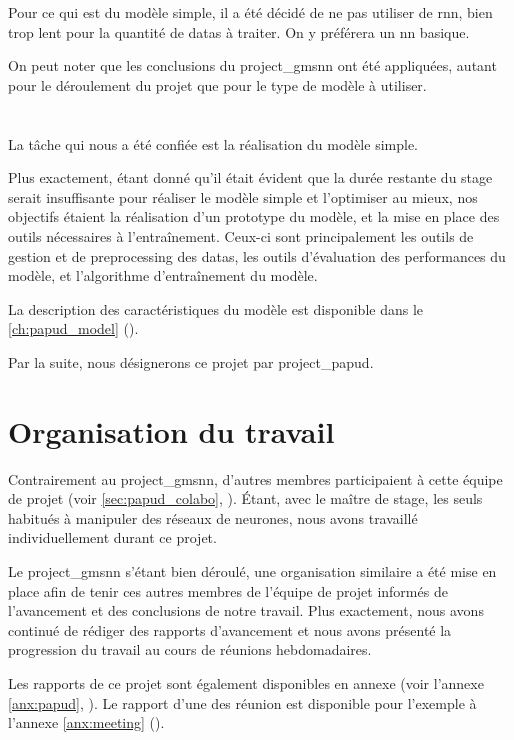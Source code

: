 Pour ce qui est du modèle simple, il a été décidé de ne pas utiliser de \gls{rnn}, bien trop lent pour la quantité de \glspl{data} à traiter. On y préférera un \gls{nn} basique.

On peut noter que les conclusions du \gls{project_gmsnn} ont été appliquées, autant pour le déroulement du projet que pour le type de modèle à utiliser.


\section{}
La tâche qui nous a été confiée est la réalisation du modèle simple.

Plus exactement, étant donné qu'il était évident que la durée restante du stage serait insuffisante pour réaliser le modèle simple et l'optimiser au mieux, nos objectifs étaient la réalisation d'un prototype du modèle, et la mise en place des outils nécessaires à l'entraînement.
Ceux-ci sont principalement les outils de gestion et de \gls{preprocessing} des \glspl{data}, les outils d'évaluation des performances du modèle, et l'algorithme d'entraînement du modèle.

La description des caractéristiques du modèle est disponible dans le \autoref{ch:papud_model} ().

Par la suite, nous désignerons ce projet par \og \gls{project_papud}\fg{}.

\section{Organisation du travail}
Contrairement au \gls{project_gmsnn}, d'autres membres participaient à cette équipe de projet (voir \autoref{sec:papud_colabo}, ).
Étant, avec le maître de stage, les seuls habitués à manipuler des réseaux de neurones, nous avons travaillé individuellement durant ce projet.

Le \gls{project_gmsnn} s'étant bien déroulé, une organisation similaire a été mise en place afin de tenir ces autres membres de l'équipe de projet informés de l'avancement et des conclusions de notre travail.
Plus exactement, nous avons continué de rédiger des rapports d'avancement et nous avons présenté la progression du travail au cours de réunions hebdomadaires.

Les rapports de ce projet sont également disponibles en annexe (voir l'annexe \ref{anx:papud}, ).
Le rapport d'une des réunion est disponible pour l'exemple à l'annexe \ref{anx:meeting} (). %

